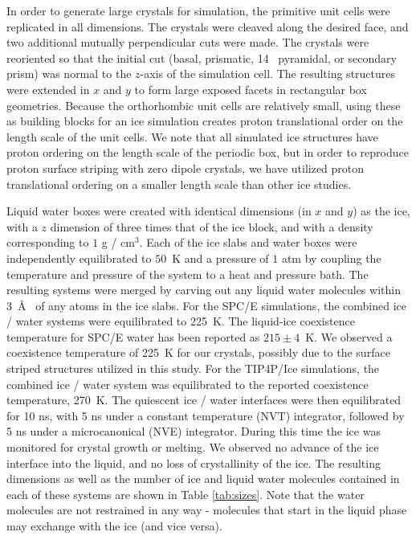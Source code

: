 In order to generate large crystals for simulation, the primitive unit
cells were replicated in all dimensions. The crystals were cleaved along
the desired face, and two additional mutually perpendicular cuts were
made.  The crystals were reoriented so that the initial cut (basal,
prismatic, 14 \degree~pyramidal, or secondary prism) was normal to the
$z$-axis of the simulation cell.  The resulting structures were
extended in $x$ and $y$ to form large exposed facets in rectangular
box geometries.  Because the orthorhombic unit cells are relatively
small, using these as building blocks for an ice simulation creates
proton translational order on the length scale of the unit cells. We
note that all simulated ice structures have proton ordering on the
length scale of the periodic box, but in order to reproduce proton
surface striping with zero dipole crystals, we have utilized proton
translational ordering on a smaller length scale than other ice
studies.

Liquid water boxes were created with identical dimensions (in $x$ and
$y$) as the ice, with a $z$ dimension of three times that of the ice
block, and with a density corresponding to $1$ g / cm$^3$.  Each of
the ice slabs and water boxes were independently equilibrated to
$50$~K and a pressure of $1$ atm by coupling the temperature and
pressure of the system to a heat and pressure bath. The resulting
systems were merged by carving out any liquid water molecules within
3~\AA~ of any atoms in the ice slabs.  For the SPC/E simulations, the
combined ice / water systems were equilibrated to 225~K. The
liquid-ice coexistence temperature for SPC/E water has been reported
as $215 \pm 4$~K.\cite{Vega2006a,Fernandez2006} We observed a
coexistence temperature of 225~K for our crystals, possibly due to the
surface striped structures utilized in this study. For the TIP4P/Ice
simulations, the combined ice / water system was equilibrated to the
reported coexistence temperature, 270~K.\cite{Vega2006a,Fernandez2006}
The quiescent ice / water interfaces were then equilibrated for 10 ns,
with 5 ns under a constant temperature (NVT) integrator, followed by 5
ns under a microcanonical (NVE) integrator.  During this time the ice
was monitored for crystal growth or melting. We observed no advance of
the ice interface into the liquid, and no loss of crystallinity of the
ice. The resulting dimensions as well as the number of ice and liquid
water molecules contained in each of these systems are shown in Table
\ref{tab:sizes}.  Note that the water molecules are not restrained in
any way - molecules that start in the liquid phase may exchange with
the ice (and vice versa).

